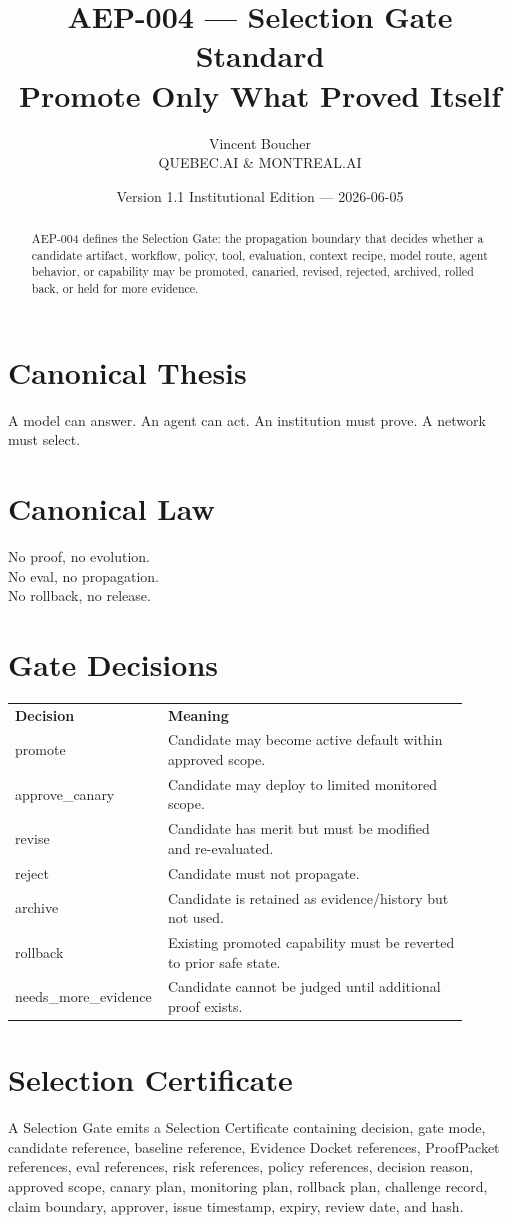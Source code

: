 \documentclass[11pt]{article}
\title{\textbf{AEP-004 --- Selection Gate Standard}\\\large Promote Only What Proved Itself}
\author{Vincent Boucher\\QUEBEC.AI \& MONTREAL.AI}
\date{Version 1.1 Institutional Edition --- 2026-06-05}
\begin{document}
\maketitle

\begin{abstract}
AEP-004 defines the Selection Gate: the propagation boundary that decides whether a candidate artifact, workflow, policy, tool, evaluation, context recipe, model route, agent behavior, or capability may be promoted, canaried, revised, rejected, archived, rolled back, or held for more evidence.
\end{abstract}

\section*{Canonical Thesis}
A model can answer. An agent can act. An institution must prove. A network must select.

\section*{Canonical Law}
No proof, no evolution.\\
No eval, no propagation.\\
No rollback, no release.

\section{Gate Decisions}
\begin{longtable}{p{0.25\linewidth}p{0.65\linewidth}}
\textbf{Decision} & \textbf{Meaning}\\
promote & Candidate may become active default within approved scope.\\
approve\_canary & Candidate may deploy to limited monitored scope.\\
revise & Candidate has merit but must be modified and re-evaluated.\\
reject & Candidate must not propagate.\\
archive & Candidate is retained as evidence/history but not used.\\
rollback & Existing promoted capability must be reverted to prior safe state.\\
needs\_more\_evidence & Candidate cannot be judged until additional proof exists.\\
\end{longtable}

\section{Selection Certificate}
A Selection Gate emits a Selection Certificate containing decision, gate mode, candidate reference, baseline reference, Evidence Docket references, ProofPacket references, eval references, risk references, policy references, decision reason, approved scope, canary plan, monitoring plan, rollback plan, challenge record, claim boundary, approver, issue timestamp, expiry, review date, and hash.
\end{document}
